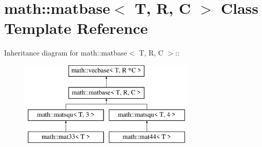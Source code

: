 \hypertarget{classmath_1_1matbase}{
\section{math::matbase$<$ T, R, C $>$ Class Template Reference}
\label{classmath_1_1matbase}
}
Inheritance diagram for math::matbase$<$ T, R, C $>$::\begin{figure}[H]
\begin{center}
\leavevmode
\includegraphics[height=4cm]{classmath_1_1matbase}
\end{center}
\end{figure}
